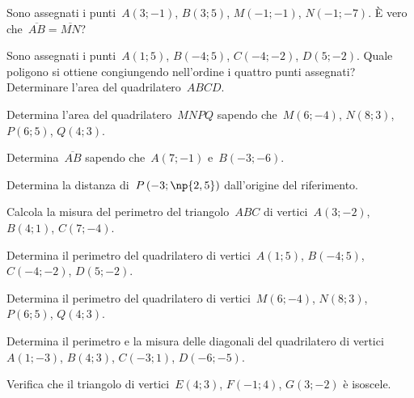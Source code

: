 \begin{esercizio}
\label{ese:8.21}
Sono assegnati i punti~$A(3;-1)$, $B(3;5)$, $M(-1;-1)$, $N(-1;-7)$. È vero che~$\overline{AB}=\overline{MN}$?
\end{esercizio}

\begin{esercizio}
\label{ese:8.22}
Sono assegnati i punti~$A(1;5)$, $B(-4;5)$, $C(-4;-2)$, $D(5;-2)$. Quale poligono si ottiene congiungendo nell'ordine i quattro
punti assegnati? Determinare l'area del quadrilatero~$ABCD$.
\end{esercizio}

\begin{esercizio}
\label{ese:8.23}
Determina l'area del quadrilatero~$MNPQ$ sapendo che~$M(6;-4)$, $N(8;3)$, $P(6;5)$, $Q(4;3)$.
\end{esercizio}

\begin{esercizio}
\label{ese:8.24}
Determina~$\overline{AB}$ sapendo che~$A(7;-1)$ e~$B(-3;-6)$.
\end{esercizio}

\begin{esercizio}
\label{ese:8.25}
Determina la distanza di~$P\left(-3;\np{2,5}\right)$ dall'origine del riferimento.
\end{esercizio}

\begin{esercizio}
\label{ese:8.26}
Calcola la misura del perimetro del triangolo~$ABC$ di vertici~$A(3;-2)$, $B(4;1)$, $C(7;-4)$.
\end{esercizio}

\begin{esercizio}
\label{ese:8.27}
Determina il perimetro del quadrilatero di vertici~$A(1;5)$, $B(-4;5)$, $C(-4;-2)$, $D(5;-2)$.
\end{esercizio}

\begin{esercizio}
\label{ese:8.28}
Determina il perimetro del quadrilatero di vertici~$M(6;-4)$, $N(8;3)$, $P(6;5)$, $Q(4;3)$.
\end{esercizio}

\begin{esercizio}
\label{ese:8.29}
Determina il perimetro e la misura delle diagonali del quadrilatero di vertici~$A(1;-3)$, $B(4;3)$, $C(-3;1)$, $D(-6;-5)$.
\end{esercizio}

\begin{esercizio}
\label{ese:8.30}
Verifica che il triangolo di vertici~$E(4;3)$, $F(-1;4)$, $G(3;-2)$ è isoscele.
\end{esercizio}

